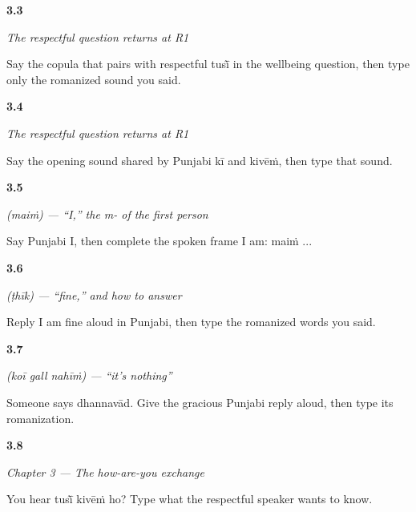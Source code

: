 \noindent\begin{minipage}[t]{\linewidth}
\raggedright
\hypertarget{review-PA-R03-wellbeing-r1-ho}{\textbf{3.3}} \emph{The respectful question returns at R1}\par
\small Say the copula that pairs with respectful tusī̃ in the wellbeing question, then type only the romanized sound you said.
\end{minipage}\par\medskip

\noindent\begin{minipage}[t]{\linewidth}
\raggedright
\hypertarget{review-PA-R03-wellbeing-r1-question-k}{\textbf{3.4}} \emph{The respectful question returns at R1}\par
\small Say the opening sound shared by Punjabi kī and kivēṁ, then type that sound.
\end{minipage}\par\medskip

\noindent\begin{minipage}[t]{\linewidth}
\raggedright
\hypertarget{review-PA-C03-main-pair}{\textbf{3.5}} \emph{ (maiṁ) — \textquotedblleft{}I,\textquotedblright{} the m- of the first person}\par
\small Say Punjabi I, then complete the spoken frame I am: maiṁ ...
\end{minipage}\par\medskip

\noindent\begin{minipage}[t]{\linewidth}
\raggedright
\hypertarget{review-PA-C03-thik-reply}{\textbf{3.6}} \emph{ (ṭhīk) — \textquotedblleft{}fine,\textquotedblright{} and how to answer}\par
\small Reply I am fine aloud in Punjabi, then type the romanized words you said.
\end{minipage}\par\medskip

\noindent\begin{minipage}[t]{\linewidth}
\raggedright
\hypertarget{review-PA-C03-koi-gall-nahin-response}{\textbf{3.7}} \emph{   (koī gall nahīṁ) — \textquotedblleft{}it's nothing\textquotedblright{}}\par
\small Someone says dhannavād. Give the gracious Punjabi reply aloud, then type its romanization.
\end{minipage}\par\medskip

\noindent\begin{minipage}[t]{\linewidth}
\raggedright
\hypertarget{review-PA-C03-practice-listening}{\textbf{3.8}} \emph{Chapter 3 — The how-are-you exchange}\par
\small You hear tusī̃ kivēṁ ho? Type what the respectful speaker wants to know.
\end{minipage}\par\medskip

